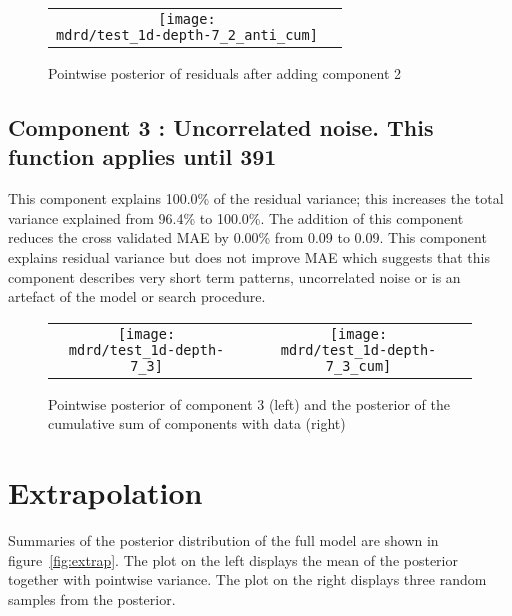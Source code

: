 \documentclass{article} %
\begin{document}
\begin{figure}[H]
\newcommand{\wmgd}{0.5\columnwidth}
\newcommand{\hmgd}{3.0cm}
\newcommand{\mdrd}{test_1d-depth-7}
\newcommand{\mbm}{\hspace{-0.3cm}}
\begin{tabular}{cc}
\mbm \texttt{[image: \\mdrd/test\_1d-depth-7\_2\_anti\_cum]}
\end{tabular}
\caption{Pointwise posterior of residuals after adding component 2}
\label{fig:comp2}
\end{figure}

\subsection{Component 3 : Uncorrelated noise. This function applies until  391}



This component explains 100.0\% of the residual variance; this increases the total variance explained from 96.4\% to 100.0\%.
The addition of this component reduces the cross validated MAE by 0.00\% from 0.09 to 0.09.
This component explains residual variance but does not improve MAE which suggests that this component describes very short term patterns, uncorrelated noise or is an artefact of the model or search procedure.

\begin{figure}[H]
\newcommand{\wmgd}{0.5\columnwidth}
\newcommand{\hmgd}{3.0cm}
\newcommand{\mdrd}{test_1d-depth-7}
\newcommand{\mbm}{\hspace{-0.3cm}}
\begin{tabular}{cc}
\mbm \texttt{[image: \\mdrd/test\_1d-depth-7\_3]} & \texttt{[image: \\mdrd/test\_1d-depth-7\_3\_cum]}
\end{tabular}
\caption{Pointwise posterior of component 3 (left) and the posterior of the cumulative sum of components with data (right)}
\label{fig:comp3}
\end{figure}

\section{Extrapolation}
\label{sec:extrap}

Summaries of the posterior distribution of the full model are shown in figure~\ref{fig:extrap}.
The plot on the left displays the mean of the posterior together with pointwise variance.
The plot on the right displays three random samples from the posterior.
\end{document}

